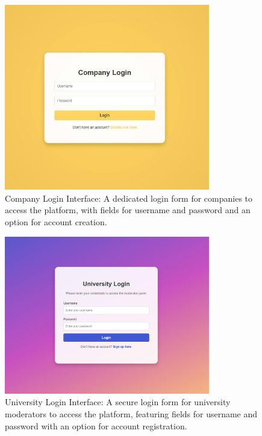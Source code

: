 \begin{figure}[H]
\centering
\includegraphics[width=0.8\textwidth]{Images/3.jpg}
\caption{\label{fig:metamodel3}Company Login Interface: A dedicated login form for companies to access the platform, with fields for username and password and an option for account creation.}
\end{figure}

\begin{figure}[H]
\centering
\includegraphics[width=0.8\textwidth]{Images/4.jpg}
\caption{\label{fig:metamodel4}University Login Interface: A secure login form for university moderators to access the platform, featuring fields for username and password with an option for account registration.}
\end{figure}

